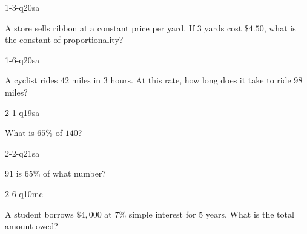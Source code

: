 
\begin{practiceQuestion}{1-3-q20}{sa}
\begin{questionText}
A store sells ribbon at a constant price per yard. If $3$ yards cost $\$4.50$, what is the constant of proportionality?
\end{questionText}
\end{practiceQuestion}

\begin{practiceQuestion}{1-6-q20}{sa}
\begin{questionText}
A cyclist rides $42$ miles in $3$ hours. At this rate, how long does it take to ride $98$ miles?
\end{questionText}
\end{practiceQuestion}

\begin{practiceQuestion}{2-1-q19}{sa}
\begin{questionText}
What is $65\%$ of $140$?
\end{questionText}
\end{practiceQuestion}

\begin{practiceQuestion}{2-2-q21}{sa}
\begin{questionText}
$91$ is $65\%$ of what number?
\end{questionText}
\end{practiceQuestion}

\begin{practiceQuestion}{2-6-q10}{mc}
\begin{questionText}
A student borrows $\$4{,}000$ at $7\%$ simple interest for $5$ years. What is the total amount owed?
\end{questionText}
\end{practiceQuestion}

